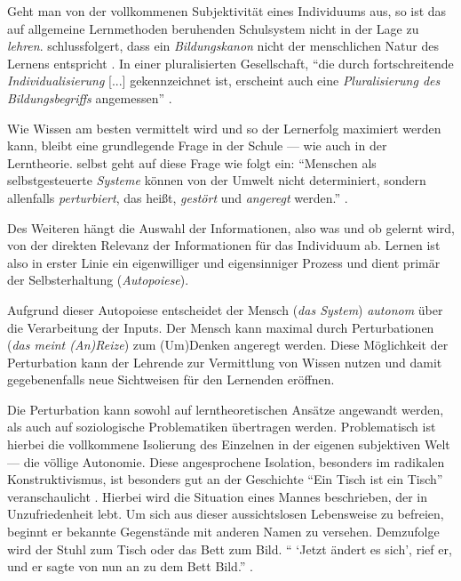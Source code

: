 Geht man von der vollkommenen Subjektivität eines Individuums aus, so ist das auf allgemeine Lernmethoden beruhenden Schulsystem nicht in der Lage zu \emph{lehren}.
\citeauthor{siebert-2003} schlussfolgert, dass ein \emph{Bildungskanon} nicht der menschlichen Natur des Lernens entspricht \parencite[vgl.][28]{siebert-2003}.
In einer pluralisierten Gesellschaft, ``die durch fortschreitende \emph{Individualisierung} [...] gekennzeichnet ist, erscheint auch eine \emph{Pluralisierung des Bildungsbegriffs} angemessen'' \parencite[vgl.][29]{siebert-2003}.

Wie Wissen am besten vermittelt wird und so der Lernerfolg maximiert werden kann, bleibt eine grundlegende Frage in der Schule --- wie auch in der Lerntheorie.
\citeauthor{siebert-2003} selbst geht auf diese Frage wie folgt ein:
``Menschen als selbstgesteuerte \emph{Systeme} können von der Umwelt nicht determiniert, sondern allenfalls \emph{perturbiert}, das heißt, \emph{gestört} und \emph{angeregt} werden.'' \parencite[vgl.][5]{siebert-2003}.

Des Weiteren hängt die Auswahl der Informationen, also was und ob gelernt wird, von der direkten Relevanz der Informationen für das Individuum ab.
Lernen ist also in erster Linie ein eigenwilliger und eigensinniger Prozess und dient primär der Selbsterhaltung (\emph{Autopoiese}).

Aufgrund dieser Autopoiese entscheidet der Mensch (\emph{das System}) \emph{autonom} über die Verarbeitung der Inputs.
Der Mensch kann maximal durch Perturbationen (\emph{das meint (An)Reize}) zum (Um)Denken angeregt werden.
Diese Möglichkeit der Perturbation kann der Lehrende zur Vermittlung von Wissen nutzen und damit gegebenenfalls neue Sichtweisen für den Lernenden eröffnen.

Die Perturbation kann sowohl auf lerntheoretischen Ansätze angewandt werden, als auch auf soziologische Problematiken übertragen werden.
Problematisch ist hierbei die vollkommene Isolierung des Einzelnen in der eigenen subjektiven Welt --- die völlige Autonomie.
Diese angesprochene Isolation, besonders im radikalen Konstruktivismus, ist besonders gut an der Geschichte ``Ein Tisch ist ein Tisch'' veranschaulicht \parencite{bichsel-1990}.
Hierbei wird die Situation eines Mannes beschrieben, der in Unzufriedenheit lebt.
Um sich aus dieser aussichtslosen Lebensweise zu befreien, beginnt er bekannte Gegenstände mit anderen Namen zu versehen.
Demzufolge wird der Stuhl zum Tisch oder das Bett zum Bild.
`` `Jetzt ändert es sich', rief er, und er sagte von nun an zu dem Bett Bild.'' \parencite[vgl.][18]{bichsel-1990}.

